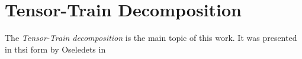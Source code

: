 \chapter{Tensor-Train Decomposition}

The \emph{Tensor-Train decomposition} is the main topic of this work. It was presented in thsi form by Oseledets in \cite{oseledets2011tt}
